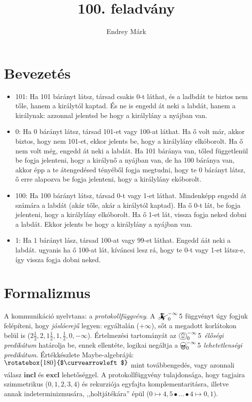 \documentclass{article}
\title{100. feladvány}
\author{Endrey Márk}
\newcommand{\nothing}{\text{\raisebox{0.4em}{\rotatebox{180}{$\curvearrowleft$}}}}%
\newcommand{\just}[1]{\boxed{#1}}%
\newcommand{\incl}{\mathbf{incl}}
\newcommand{\excl}{\mathbf{excl}}
\newcommand{\mainfun}[3]{\mathwitch_{#1}^{#2}#3}
\newcommand{\yesmainfun}[3]{\bigpumpkin_{#1}^{#2}#3}
\newcommand{\nomainfun}[3]{\bigskull_{#1}^{#2}#3}
\begin{document}
	\maketitle

	\section{Bevezetés}

	\begin{itemize}
		\item 101: Ha 101 bárányt látsz, társad csakis 0-t láthat, és a ladbdát te biztos nem tőle, hanem a királytól kaptad. És ne is engedd át neki a labdát, hanem a királynak: azzonnal jelentsd be hogy a királylány a nyájban van.
		\item 0: Ha   0 bárányt látsz, társad 101-et vagy 100-at láthat. Ha ő volt már, akkor biztos, hogy nem 101-et, ekkor jelents be, hogy a királylány elkóborolt. Ha ő nem volt még, engedd át neki a labdát. Ha 101 báránya van, tőled függetlenül be fogja jelenteni, hogy a királynő a nyájban van, de ha 100 báránya van, akkor  épp a te átengedésed tényéből fogja megtudni, hogy te 0 bárányt látsz, ő erre alapozva be fogja jelenteni, hogy a királylány ekóborolt.
		\item 100: Ha 100 bárányt látsz, társad 0-t vagy 1-et láthat. Mindenképp engedd át számára a labdát (akár tőle, akár a királytól kaptad). Ha ő 0-t lát, be fogja jelenteni, hogy a királylány elkóborolt. Ha ő 1-et lát, vissza fogja neked dobni a labdát. Ekkor jelents be hogy a királylány a nyájban van.
		\item 1: Ha 1 bárányt lász, társad 100-at vagy 99-et láthat. Engedd áát neki a labdát. ugyanis ha ő 100-at lát, kíváncsi lesz rá, hogy te 0-t vagy 1-et látsz-e, így vissza fogja dobni neked.
	\end{itemize}

	\section{Formalizmus}

	A kommunikáció nyelvtana: a \emph{protokollfüggvény}. A $\mainfun0{-\infty}5$ függvényt úgy fogjuk felépíteni, hogy \emph{jóslóerejű} legyen: egyáltalán ($+\infty$), sőt a megadott korlátokon belül is ($2\frac12, 2, 1\frac12, 1, \frac12, 0, -\infty$). Értelmezési tartományát az $\yesmainfun0{-\infty}5$ \emph{élőségi predikátum} határolja be, ennek ellentéte, logikai negáltja a $\nomainfun0{-\infty}5$ \emph{lehetetlenségi predikátum}. Értékkészlete Maybe-algebrájú: $\nothing$ mint továbbengedés, vagy azonnali válasz $\just\incl$ és $\just\excl$ lehetőséggel. A protokollfüggvény tulajdonsága, hogy tagjaira szimmetrikus ($0, 1, 2, 3,4$) és rekurziója egyfajta komplementaritásra, illetve annak indeterminizmusára, ,,holtjátékára'' épül ($0 \mapsto 4, 5 \bullet \dots \bullet 4 \mapsto 0, 1$).
\end{document}
